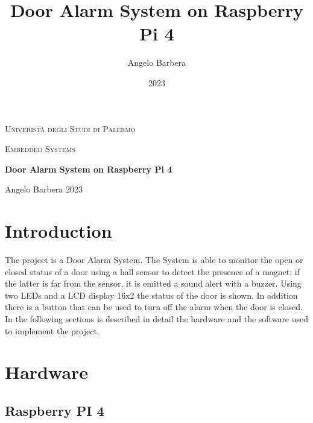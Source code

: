 \documentclass[]{article}
\title{\huge Door Alarm System on Raspberry Pi 4}
\author{Angelo Barbera}
\date{2023}
\begin{document}
\begin{titlepage}
	\centering
	{\scshape\LARGE Univeristà degli Studi di Palermo \par}
	\vspace{0.6cm}
	{\scshape\Large Embedded Systems \par}
	\vspace{1.8cm}
	{\huge\bfseries Door Alarm System on Raspberry Pi 4 \par}
	\vspace{2cm}
	\vfill
	{\large Angelo Barbera 2023 \par}
\end{titlepage}


\tableofcontents

\clearpage
{}


\section{Introduction}
The project is a Door Alarm System. The System is able to monitor the open or closed status of a door using a hall sensor
to detect the presence of a magnet; if the latter is far from the sensor, it is emitted a sound alert with a buzzer. 
Using two LEDs and a LCD display 16x2 the status of the door is shown. In addition there is a button that can be used to 
turn off the alarm when the door is closed.
\\ 
In the following sections is described in detail the hardware and the software used to implement the project.

\section{Hardware}

\subsection{Raspberry PI 4}
\end{document}
